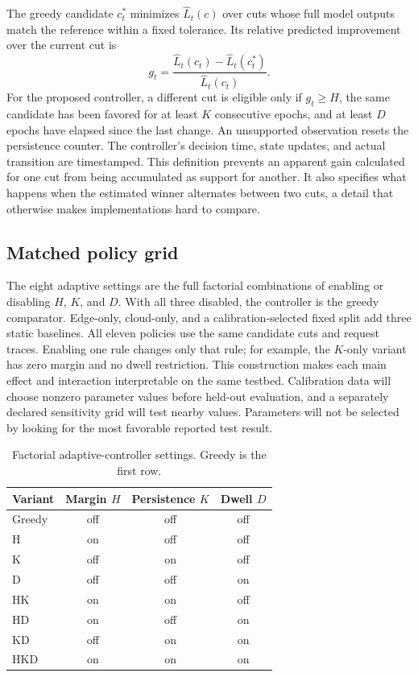 \documentclass[10pt,a4paper,twocolumn]{article}
\begin{document}
The greedy candidate $c_t^*$ minimizes $\widehat L_t(c)$ over cuts whose full model outputs match the reference within a fixed tolerance. Its relative predicted improvement over the current cut is
\begin{equation}
g_t=\frac{\widehat L_t(c_t)-\widehat L_t(c_t^*)}{\widehat L_t(c_t)}.
\label{eq:gain}
\end{equation}
For the proposed controller, a different cut is eligible only if $g_t\ge H$, the same candidate has been favored for at least $K$ consecutive epochs, and at least $D$ epochs have elapsed since the last change. An unsupported observation resets the persistence counter. The controller's decision time, state updates, and actual transition are timestamped. This definition prevents an apparent gain calculated for one cut from being accumulated as support for another. It also specifies what happens when the estimated winner alternates between two cuts, a detail that otherwise makes implementations hard to compare.

\subsection{Matched policy grid}
The eight adaptive settings are the full factorial combinations of enabling or disabling $H$, $K$, and $D$. With all three disabled, the controller is the greedy comparator. Edge-only, cloud-only, and a calibration-selected fixed split add three static baselines. All eleven policies use the same candidate cuts and request traces. Enabling one rule changes only that rule; for example, the $K$-only variant has zero margin and no dwell restriction. This construction makes each main effect and interaction interpretable on the same testbed. Calibration data will choose nonzero parameter values before held-out evaluation, and a separately declared sensitivity grid will test nearby values. Parameters will not be selected by looking for the most favorable reported test result.

\begin{table}[t]
\centering\small
\caption{Factorial adaptive-controller settings. Greedy is the first row.}
\label{tab:factorial}
\begin{tabular}{@{}lccc@{}}\toprule
Variant & Margin $H$ & Persistence $K$ & Dwell $D$\\\midrule
Greedy & off & off & off\\
H & on & off & off\\
K & off & on & off\\
D & off & off & on\\
HK & on & on & off\\
HD & on & off & on\\
KD & off & on & on\\
HKD & on & on & on\\\bottomrule
\end{tabular}
\end{table}
\end{document}
